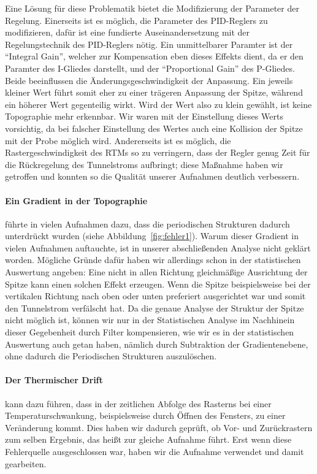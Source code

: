 Eine Lösung für diese Problematik bietet die Modifizierung der Parameter der Regelung. 
Einerseits ist es möglich, die Parameter des PID-Reglers zu modifizieren, dafür
ist eine fundierte Auseinandersetzung mit der Regelungstechnik des PID-Reglers nötig.
Ein unmittelbarer Paramter ist der ``Integral Gain'', welcher zur Kompensation eben dieses
Effekts dient, da er den Paramter des I-Gliedes darstellt,
und der ``Proportional Gain'' des P-Gliedes. Beide beeinflussen die Änderungsgeschwindigkeit
der Anpassung. Ein jeweils kleiner Wert führt somit eher zu einer trägeren Anpassung
der Spitze, während ein höherer Wert gegenteilig wirkt. Wird der Wert also zu klein gewählt,
ist keine Topographie mehr erkennbar. Wir waren mit der Einstellung dieses Werts vorsichtig,
da bei falscher Einstellung des Wertes auch eine Kollision der Spitze mit der Probe möglich wird.
Andererseits ist es möglich, die Rastergeschwindigkeit des RTMs so zu verringern, dass der
Regler genug Zeit für die Rückregelung des Tunnelstroms aufbringt; diese Maßnahme haben wir 
getroffen und konnten so die Qualität unserer Aufnahmen deutlich verbessern.
\paragraph{Ein Gradient in der Topographie} führte in vielen Aufnahmen
dazu, dass die periodischen Strukturen dadurch unterdrückt wurden (siehe Abbildung~\ref{fig:fehler1}).
Warum dieser Gradient in vielen Aufnahmen auftauchte, ist in unserer abschließenden Analyse
nicht geklärt worden. Mögliche Gründe dafür haben wir allerdings schon in der statistischen Auswertung
angeben: Eine nicht in allen Richtung gleichmäßige Ausrichtung der Spitze kann einen solchen
Effekt erzeugen. Wenn die Spitze beispielsweise 
bei der vertikalen Richtung nach oben oder unten preferiert ausgerichtet
war und somit den Tunnelstrom verfälscht hat.
Da die genaue Analyse der Struktur der Spitze nicht möglich ist, können wir nur in der 
Statistischen Analyse im Nachhinein dieser Gegebenheit durch Filter kompensieren, wie wir es
in der statistischen Auswertung auch getan haben, nämlich durch Subtraktion der Gradientenebene,
ohne dadurch die Periodischen Strukturen auszulöschen.
\paragraph{Der Thermischer Drift} kann dazu führen, dass in der zeitlichen Abfolge des Rasterns
bei einer Temperaturschwankung, beispielsweise durch Öffnen des Fensters, zu einer Veränderung
kommt. Dies haben wir dadurch geprüft, ob Vor- und Zurückrastern zum selben Ergebnis, das heißt
zur gleiche Aufnahme führt. Erst wenn diese Fehlerquelle ausgeschlossen war, haben wir 
die Aufnahme verwendet und damit gearbeiten.
